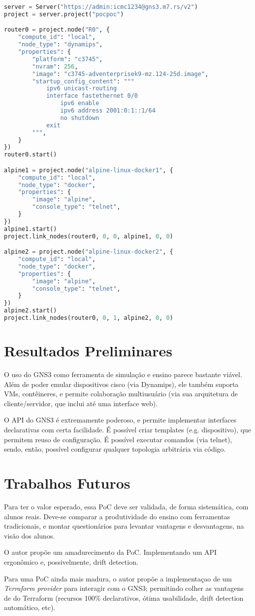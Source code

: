 \documentclass[12pt]{article}
\begin{document}
\begin{lstlisting}[language=Python]
server = Server("https://admin:icmc1234@gns3.m7.rs/v2")
project = server.project("pocpoc")

router0 = project.node("R0", {
    "compute_id": "local",
    "node_type": "dynamips",
    "properties": {
        "platform": "c3745",
        "nvram": 256,
        "image": "c3745-adventerprisek9-mz.124-25d.image",
        "startup_config_content": """
            ipv6 unicast-routing
            interface fastethernet 0/0
                ipv6 enable
                ipv6 address 2001:0:1::1/64
                no shutdown
            exit
        """,
    }
})
router0.start()

alpine1 = project.node("alpine-linux-docker1", {
    "compute_id": "local",
    "node_type": "docker",
    "properties": {
        "image": "alpine",
        "console_type": "telnet",
    }
})
alpine1.start()
project.link_nodes(router0, 0, 0, alpine1, 0, 0)

alpine2 = project.node("alpine-linux-docker2", {
    "compute_id": "local",
    "node_type": "docker",
    "properties": {
        "image": "alpine",
        "console_type": "telnet",
    }
})
alpine2.start()
project.link_nodes(router0, 0, 1, alpine2, 0, 0)
\end{lstlisting}

\section{Resultados Preliminares}

O uso do GNS3 como ferramenta de simulação e ensino parece bastante viável.
Além de poder emular dispositivos cisco (via Dynamips), ele também suporta VMs,
contêineres, e permite colaboração multiusuário (via sua arquitetura de
cliente/servidor, que inclui até uma interface web).

O API do GNS3 é extremamente poderoso, e permite implementar interfaces
declarativas com certa facilidade. É possível criar templates (e.g.
dispositivo), que permitem reuso de configuração. É possível executar comandos
(via telnet), sendo, então, possível configurar qualquer topologia arbitrária
via código.

\section{Trabalhos Futuros}

Para ter o valor esperado, essa PoC deve ser validada, de forma sistemática,
com alunos reais. Deve-se comparar a produtividade do ensino com ferramentas
tradicionais, e montar questionários para levantar vantagens e desvantagens, na
visão dos alunos.

O autor propõe um amadurecimento da PoC. Implementando um API ergonômico e,
possivelmente, drift detection.

Para uma PoC ainda mais madura, o autor propõe a implementaçao de um
\textit{Terraform provider} para interagir com o GNS3; permitindo colher as
vantagens de do Terraform (recursos 100\% declarativos, ótima usabilidade,
drift detection automático, etc).



\end{document}
